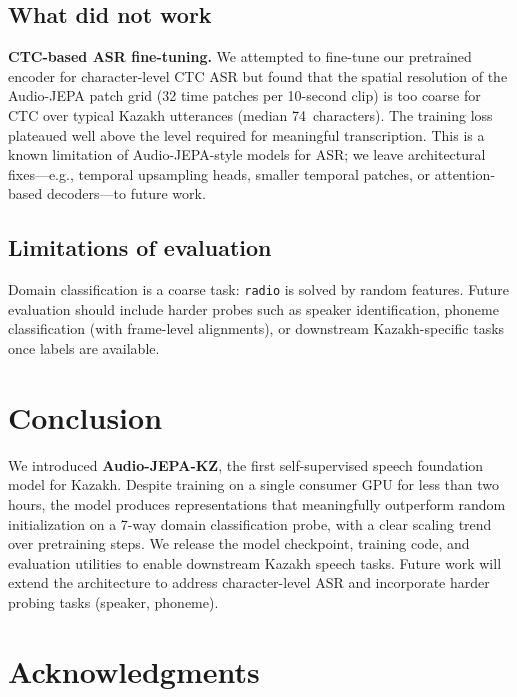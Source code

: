 \documentclass[conference]{IEEEtran}
\begin{document}
\subsection{What did not work}

\textbf{CTC-based ASR fine-tuning.} We attempted to fine-tune our pretrained encoder for character-level CTC ASR but found that the spatial resolution of the Audio-JEPA patch grid (32 time patches per 10-second clip) is too coarse for CTC over typical Kazakh utterances (median 74~characters). The training loss plateaued well above the level required for meaningful transcription. This is a known limitation of Audio-JEPA-style models for ASR; we leave architectural fixes---e.g., temporal upsampling heads, smaller temporal patches, or attention-based decoders---to future work.

\subsection{Limitations of evaluation}

Domain classification is a coarse task: \texttt{radio} is solved by random features. Future evaluation should include harder probes such as speaker identification, phoneme classification (with frame-level alignments), or downstream Kazakh-specific tasks once labels are available.

\section{Conclusion}

We introduced \textbf{Audio-JEPA-KZ}, the first self-supervised speech foundation model for Kazakh. Despite training on a single consumer GPU for less than two hours, the model produces representations that meaningfully outperform random initialization on a 7-way domain classification probe, with a clear scaling trend over pretraining steps. We release the model checkpoint, training code, and evaluation utilities to enable downstream Kazakh speech tasks. Future work will extend the architecture to address character-level ASR and incorporate harder probing tasks (speaker, phoneme).

\section*{Acknowledgments}
\end{document}

